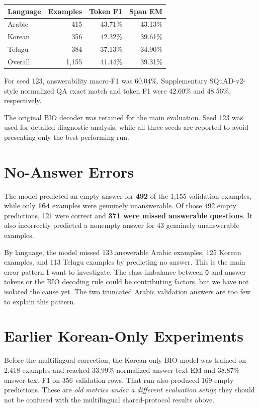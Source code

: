 \documentclass[a4paper,11pt]{article}
\begin{document}
\begin{center}
\small
\begin{tabular}{lrrr}
\hline
Language & Examples & Token F1 & Span EM \\
\hline
Arabic & 415 & 43.71\% & 43.13\% \\
Korean & 356 & 42.32\% & 39.61\% \\
Telugu & 384 & 37.13\% & 34.90\% \\
\hline
Overall & 1,155 & 41.44\% & 39.31\% \\
\hline
\end{tabular}
\end{center}

For seed 123, answerability macro-F1 was 60.04\%.
Supplementary SQuAD-v2-style normalized QA exact
match and token F1 were 42.60\% and 48.56\%,
respectively.

The original BIO decoder was retained for the main
evaluation. Seed 123 was used for detailed diagnostic
analysis, while all three seeds are reported to avoid
presenting only the best-performing run.


\section{No-Answer Errors}

The model predicted an empty answer for \textbf{492} of the 1,155 validation examples, while only \textbf{164} examples were genuinely unanswerable. Of those 492 empty predictions, 121 were correct and \textbf{371 were missed answerable questions}. It also incorrectly predicted a nonempty answer for 43 genuinely unanswerable examples.

By language, the model missed 133 answerable Arabic examples, 125 Korean examples, and 113 Telugu examples by predicting no answer. This is the main error pattern I want to investigate. The class imbalance between \texttt{O} and answer tokens or the BIO decoding rule could be contributing factors, but we have not isolated the cause yet. The two truncated Arabic validation answers are too few to explain this pattern.

\section{Earlier Korean-Only Experiments}

Before the multilingual correction, the Korean-only BIO model was trained on 2,418 examples and reached 33.99\% normalized answer-text EM and 38.87\% answer-text F1 on 356 validation rows. That run also produced 169 empty predictions. These are \emph{old metrics under a different evaluation setup}; they should not be confused with the multilingual shared-protocol results above.
\end{document}
